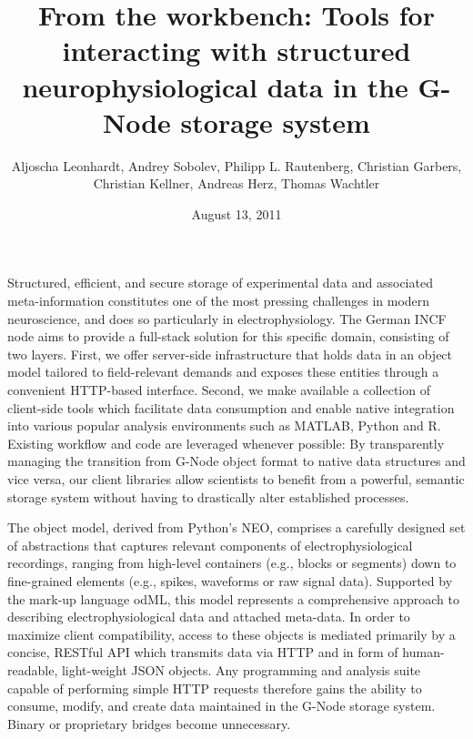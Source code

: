 \documentclass[a4paper]{article}
\begin{document}
\title{From the workbench: Tools for interacting with structured
  neurophysiological data in the G-Node storage system}

\author{

  Aljoscha Leonhardt,
  Andrey Sobolev,
  Philipp L. Rautenberg,
  Christian Garbers,
  Christian Kellner,
  Andreas Herz,
  Thomas Wachtler

}
\date{August 13, 2011}

\maketitle


Structured, efficient, and secure storage of experimental data and
associated meta-information constitutes one of the most pressing
challenges in modern neuroscience, and does so particularly in
electrophysiology. The German INCF node aims to provide a full-stack
solution for this specific domain, consisting of two layers. First, we
offer server-side infrastructure that holds data in an object model
tailored to field-relevant demands and exposes these entities through
a convenient HTTP-based interface. Second, we make available a
collection of client-side tools which facilitate data consumption and
enable native integration into various popular analysis environments
such as MATLAB, Python and R. Existing workflow and code are leveraged
whenever possible: By transparently managing the transition from
G-Node object format to native data structures and vice versa, our
client libraries allow scientists to benefit from a powerful, semantic
storage system without having to drastically alter established
processes.

The object model, derived from Python's NEO, comprises a carefully
designed set of abstractions that captures relevant components of
electrophysiological recordings, ranging from high-level containers
(e.g., blocks or segments) down to fine-grained elements (e.g.,
spikes, waveforms or raw signal data). Supported by the mark-up
language odML, this model represents a comprehensive approach to
describing electrophysiological data and attached meta-data. In order
to maximize client compatibility, access to these objects is mediated
primarily by a concise, RESTful API which transmits data via HTTP and
in form of human-readable, light-weight JSON objects. Any programming
and analysis suite capable of performing simple HTTP requests
therefore gains the ability to consume, modify, and create data
maintained in the G-Node storage system. Binary or proprietary bridges
become unnecessary.
\end{document}
